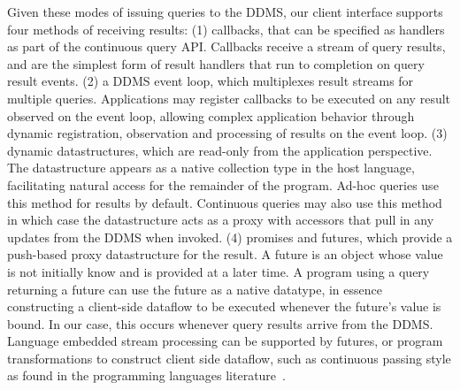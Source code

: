 Given these modes of issuing queries to the DDMS, our client interface supports
four methods of receiving results:
(1) callbacks, that can be specified as handlers as part of the continuous query
API. Callbacks receive a stream of query results, and are the simplest form of
result handlers that run to completion on query result events.  
(2) a DDMS event loop, which multiplexes result streams for multiple queries.
Applications may register callbacks to be executed on any result observed on the
event loop, allowing complex application behavior through dynamic
registration, observation and processing of results on the event loop.
(3) dynamic datastructures, which are read-only from the application
perspective. The datastructure appears as a native collection type in the host
language, facilitating natural access for the remainder of the program. Ad-hoc
queries use this method for results by default. Continuous queries may also use
this method in which case the datastructure acts as a proxy with accessors that
pull in any updates from the DDMS when invoked.
(4) promises and futures, which provide a push-based proxy datastructure for the
result. A future is an object whose value is not initially know and is provided
at a later time. A program using a query returning a future can use the future
as a native datatype, in essence constructing a client-side dataflow to be
executed whenever the future's value is bound. In our case, this occurs whenever
query results arrive from the DDMS. Language embedded stream processing can be
supported by futures, or program transformations to construct client side
dataflow, such as continuous passing style as found in the programming languages
literature~\cite{sussman-hsc:98}.








